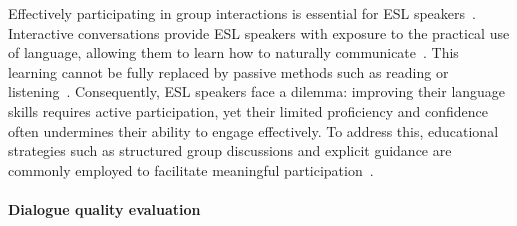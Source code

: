 Effectively participating in group interactions is essential for ESL speakers~\cite{rao2019enhancing}. Interactive conversations provide ESL speakers with exposure to the practical use of language, allowing them to learn how to naturally communicate~\cite{gao2024listenership,rao2019enhancing}. This learning cannot be fully replaced by passive methods such as reading or listening~\cite{wu2025data,maarof2018effect}. Consequently, ESL speakers face a dilemma: improving their language skills requires active participation, yet their limited proficiency and confidence often undermines their ability to engage effectively. To address this, educational strategies such as structured group discussions and explicit guidance are commonly employed to facilitate meaningful participation~\cite{pino2010english,webster2012teaching}.


\paragraph{Dialogue quality evaluation}


